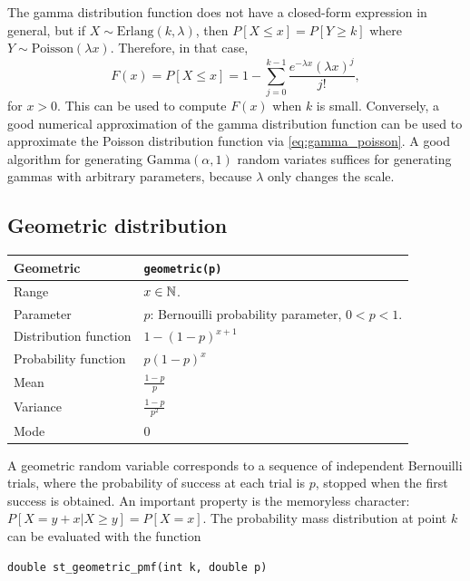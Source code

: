 The gamma distribution function does not have a closed-form expression
in general, but if $X \sim \mbox{Erlang}(k, \lambda)$, then $P[X \leq x] =
P[Y \geq k]$ where $Y \sim \mbox{Poisson}(\lambda x)$.
Therefore, in that case,
\begin{equation}
\label{eq:gamma_poisson}
F(x) = P[X \leq x] = 1 - \sum_{j = 0}^{k-1} \frac{e^{-\lambda x}
  (\lambda x)^j}{j!},
\end{equation}
for $x > 0$.
This can be used to compute $F(x)$ when $k$ is small.
Conversely, a good numerical approximation of the gamma distribution
function can be used to approximate the Poisson distribution function
via \eqref{eq:gamma_poisson}.
A good algorithm for generating $\mbox{Gamma}(\alpha, 1)$ random
variates suffices for generating gammas with arbitrary parameters,
because $\lambda$ only changes the scale.

\subsection{Geometric distribution}

\begin{table}[htb]
\begin{tabularx}{\textwidth}{lX}
Geometric & \verb|geometric(p)|\\
\hline
Range & $x \in \mathbb{N}$.\\
Parameter & $p$: Bernouilli probability parameter, $0 < p < 1$. \\
Distribution function & $1-(1-p)^{x+1}$ \\
Probability function & $p(1-p)^x$ \\
Mean & $\frac{1-p}{p}$ \\
Variance & $\frac{1-p}{p^2}$ \\
Mode & $0$ \\
\hline
\end{tabularx}
\end{table}

\mbox{}

A geometric random variable corresponds to a sequence of independent Bernouilli trials, where the probability of success at each trial is $p$, stopped when the first success is obtained.
An important property is the memoryless character: $P[X=y+x | X
\ge y] = P[X=x]$.
The probability mass distribution at point $k$ can be evaluated with the function
\begin{verbatim}
double st_geometric_pmf(int k, double p)
\end{verbatim}

